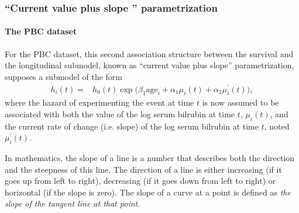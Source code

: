 \documentclass[12pt]{article}
\begin{document}
\subsubsection{``Current value plus slope '' parametrization}
\label{Current value plus slope}

\paragraph{The PBC dataset}
For the PBC dataset, this second association structure between the survival and the longitudinal submodel, known as ``current value plus slope'' parametrization, supposes a submodel of the form
\begin{equation}
\begin{split}
h_i(t) = &h_0 (t) \exp \big(\beta_1 \text{age}_i+ \alpha_1 \mu_i(t)+\alpha_2 \mu_i^{'}(t)\big),
\end{split}
\label{Survival model_p2}
\end{equation}
where the hazard of experimenting the event at time $t$ is now assumed to be associated with both the value of the log serum bilrubin at time $t$, $\mu_i(t)$, and the current rate of change (i.e. slope) of the log serum bilrubin at time $t$, noted $\mu_i^{'}(t)$.

In mathematics, the slope of a line is a number that describes both the direction and the steepness of this line. The direction of a line is either increasing (if it goes up from left to right), decreasing (if it goes down from left to right) or horizontal (if the slope is zero). The slope of a curve at a point is defined as \textit{the slope of the tangent line at that point}.
\end{document}
